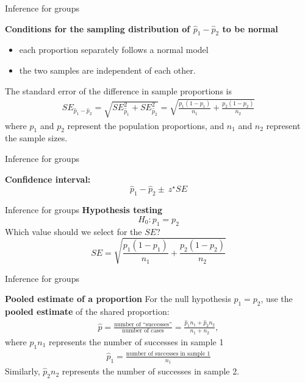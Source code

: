 \documentclass[12pt,a4paper]{beamer}
\begin{document}
\begin{frame}{Inference for groups}
\small	\begin{framed}
		\textbf{Conditions for the sampling distribution of $\hat{p}_1 - \hat{p}_2$ to be normal}
	\begin{itemize}
	\setlength{\itemsep}{0mm}
	\item each proportion separately follows a normal model
	\item the two samples are independent of each other.
	\end{itemize}
\end{framed}
\small\begin{framed}
	The standard error of the difference in sample proportions is
	\begin{eqnarray*}
	SE_{\hat{p}_1 - \hat{p}_2}
		= \sqrt{SE_{\hat{p}_1}^2 + SE_{\hat{p}_2}^2}
		= \sqrt{\frac{p_1(1-p_1)}{n_1} + \frac{p_2(1-p_2)}{n_2}}
	\label{seForDiffOfProp}
	\end{eqnarray*}
	where $p_1$ and $p_2$ represent the population proportions, and $n_1$ and $n_2$ represent the sample sizes.
	\end{framed}
\end{frame}
	\begin{frame}{Inference for groups}

	\textbf{Confidence interval:}
		\[\hat{p}_1-\hat{p}_2  \pm\  z^{\star}SE\]
	\end{frame}
	\begin{frame}{Inference for groups}
		\textbf{Hypothesis testing}
		\[H_0:p_1=p_2\]
		Which value should we select for the $SE$?
		\[SE = \sqrt{\frac{p_1(1-p_1)}{n_1} + \frac{p_2(1-p_2)}{n_2}}\]
		\end{frame}
		\begin{frame}{Inference for groups}
			\begin{framed}
				\textbf{Pooled estimate of a proportion}
			For the null hypothesis $p_1 = p_2$, use the \textbf{pooled estimate} of the shared proportion:
			\begin{eqnarray*}
			\hat{p} = \frac{\text{number of ``successes''}}{\text{number of cases}} = \frac{\hat{p}_1n_1 + \hat{p}_2n_2}{n_1 + n_2},
			\end{eqnarray*}
			where $\hat{p}_1n_1$ represents the number of successes in sample 1 
			\begin{eqnarray*}
			\hat{p}_1 = \frac{\text{number of successes in sample 1}}{n_1}
			\end{eqnarray*}
			Similarly, $\hat{p}_2n_2$ represents the number of successes in sample 2.
			\end{framed}
		\end{frame}
\end{document}
